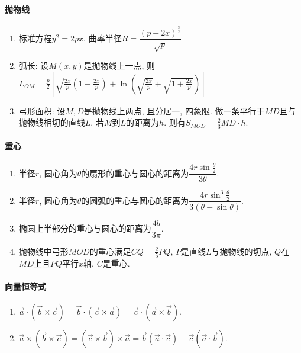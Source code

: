 \documentclass{article}
\begin{document}
\paragraph{抛物线}

\begin{enumerate}
    \item 标准方程$y^2 = 2px$, 曲率半径$ R = \dfrac{(p + 2x)^{\frac{3}{2}}}{\sqrt{p}}$
    \item 弧长: 设$M(x, y)$是抛物线上一点, 则$L_{OM} = \frac{p}{2} [ \sqrt{\frac{2x}{p}(1 + \frac{2x}{p})} + \ln(\sqrt{\frac{2x}{p}} + \sqrt{1 + \frac{2x}{p}})]$
    \item 弓形面积: 设$M, D$是抛物线上两点, 且分居一, 四象限. 做一条平行于$MD$且与抛物线相切的直线$L$. 若$M$到$L$的距离为$h$. 则有$S_{MOD} = \frac{2}{3}MD \cdot h$.
\end{enumerate}

\paragraph{重心}

\begin{enumerate}
    \item 半径$r$, 圆心角为$\theta$的扇形的重心与圆心的距离为$\dfrac{4r\sin\frac{\theta}{2}}{3\theta}$.
    \item 半径$r$, 圆心角为$\theta$的圆弧的重心与圆心的距离为$\dfrac{4r\sin^3\frac{\theta}{2}}{3(\theta - \sin\theta)}$.
    \item 椭圆上半部分的重心与圆心的距离为$\dfrac{4b}{3\pi}$.
    \item  抛物线中弓形$MOD$的重心满足$CQ = \frac{2}{5} PQ$, $P$是直线$L$与抛物线的切点, $Q$在$MD$上且$PQ$平行$x$轴, $C$是重心.
\end{enumerate}

\paragraph{向量恒等式}

\begin{enumerate}
    \item $\vec{a} \cdot (\vec{b} \times \vec{c}) = \vec{b} \cdot (\vec{c} \times \vec{a}) = \vec{c} \cdot (\vec{a} \times \vec{b})$.
    \item $\vec{a} \times (\vec{b} \times \vec{c}) = (\vec{c} \times \vec{b}) \times \vec{a} = \vec{b}(\vec{a} \cdot \vec{c}) - \vec{c}(\vec{a} \cdot \vec{b})$.
\end{enumerate}
\end{document}
